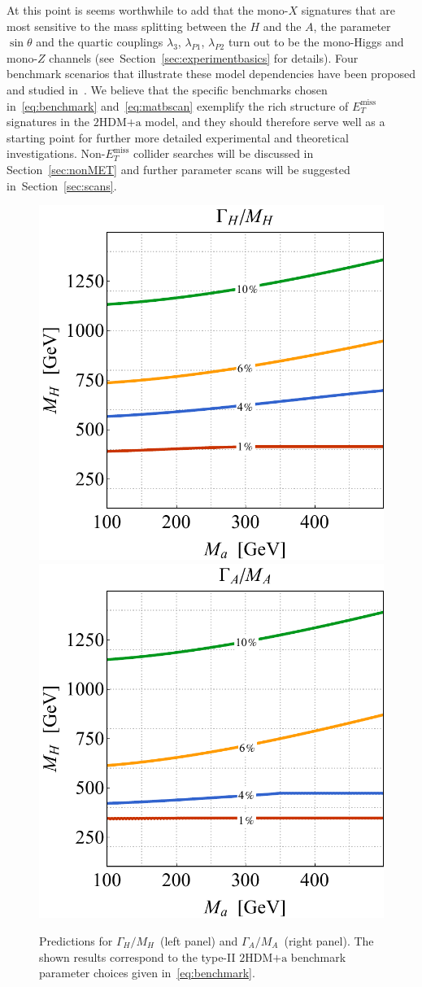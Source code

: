 \documentclass[a4paper, 11pt,notoc]{article}
\newcommand{\MET}{\ensuremath{E_T^\mathrm{miss}}\xspace}
\newcommand{\hdma}{\ensuremath{\textrm{2HDM+a}}\xspace}
\begin{document}
At this point is seems worthwhile to add that the mono-$X$ signatures that are most sensitive to the mass splitting between the $H$ and the $A$, the parameter $\sin \theta$ and the quartic couplings $\lambda_{3}$, $\lambda_{P1}$, $\lambda_{P2}$ turn out to be  the mono-Higgs and mono-$Z$ channels (see~Section~\ref{sec:experimentbasics} for details). Four benchmark scenarios that illustrate these model dependencies have been proposed and studied in~\cite{Bauer:2017ota}.  We believe that the specific benchmarks  chosen in~\eqref{eq:benchmark} and~\eqref{eq:matbscan}   exemplify  the rich structure of $\MET$ signatures in the \hdma model, and they should therefore serve well as a starting point for further more detailed experimental and theoretical investigations. Non-$\MET$ collider searches will be discussed in Section~\ref{sec:nonMET} and further parameter scans will be suggested in~Section~\ref{sec:scans}. 

\begin{figure}[t!]
\centering
\includegraphics[height=.45\textwidth]{figure5l.pdf} \qquad 
\includegraphics[height=.45\textwidth]{figure5r.pdf}
\vspace{4mm}
\caption{\label{fig:Gammas}  Predictions for  $\Gamma_H/M_H$~(left panel) and $\Gamma_A/M_A$~(right panel). The shown results correspond to the type-II \hdma benchmark parameter choices given in~\eqref{eq:benchmark}.}
\end{figure}
\end{document}
